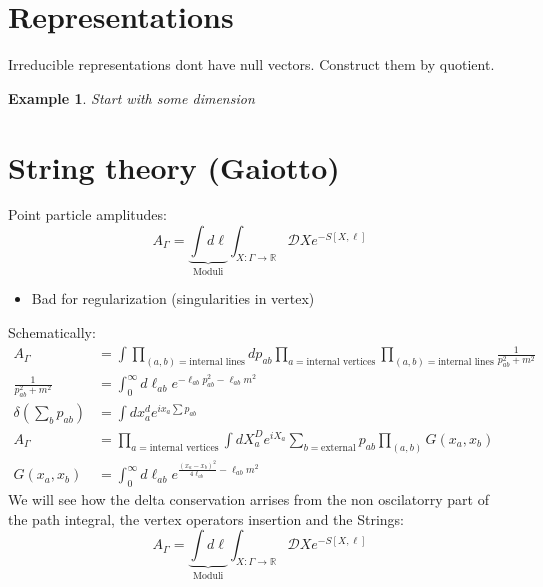 \documentclass[10pt,
 article,
 amsmath,amssymb
]{revtex4-2}
\newtheorem{example}[theorem]{Example}
\newcommand{\RR}{\mathbb{R}}
\begin{document}
\section{Representations}
Irreducible representations dont have null vectors. Construct them by quotient. 
\begin{example}
    Start with some dimension
\end{example}




\section{String theory (Gaiotto)}
Point particle amplitudes: 
$$ A_\Gamma= \underbrace{\int d\ell}_{\text{Moduli}} \int_{X:\Gamma \to \RR} \mathcal{D} X e^{-S[X,\ell]}$$
\begin{itemize}
    \item Bad for regularization (singularities in vertex)
\end{itemize}
Schematically:
\begin{align*}
    A_\Gamma&= \int \prod_{(a,b)= \text{internal lines}} d p_{ab} \prod_{a=\text{internal vertices}} \prod_{(a,b)= \text{internal lines}} \frac{1}{p^2_{ab}+m^2}\\
  \frac{1}{p_{ab}^2+m^2}&=\int^\infty_0 d\ell_{ab} e^{-\ell_{ab}p_{ab}^2-\ell_{ab}m^2}\\
    \delta(\sum_b p_{ab})&=\int dx_a^d e^{i x_a \sum p_{ab}}\\
    A_\Gamma&=\prod_{a=\text{internal vertices}} \int d X_a^D e^{i X_a} \sum_{b=\text{external}}p_{ab} \prod_{(a,b)} G(x_a,x_b) \\
    G(x_a,x_b)&=\int_0^\infty d\ell_{ab} e^{\frac{(x_a-x_b)^2}{4 \ell_{ab}}-\ell_{ab}m^2}
\end{align*}
We will see how the delta conservation arrises from the non oscilatorry part of the path integral, the vertex operators insertion and the 
Strings:
$$ A_\Gamma= \underbrace{\int d\ell}_{\text{Moduli}} \int_{X:\Gamma \to \RR} \mathcal{D} X e^{-S[X,\ell]}$$
\end{document}
